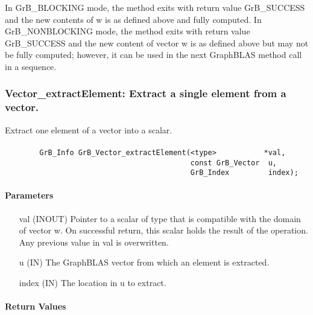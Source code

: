 In {\sf GrB\_BLOCKING} mode, the method exits with return value 
{\sf GrB\_SUCCESS} and the new contents of {\sf w} is as defined above
and fully computed.  
In {\sf GrB\_NONBLOCKING} mode, the method exits with return value 
{\sf GrB\_SUCCESS} and the new content of vector {\sf w} is as defined above 
but may not be fully computed; however, it can be used in the next GraphBLAS 
method call in a sequence.


\subsubsection{{\sf Vector\_extractElement}: Extract a single element from a vector.}
\label{Sec:Vector_extractElement}

Extract one element of a vector into a scalar. 

\paragraph{\syntax}

\begin{verbatim}
        GrB_Info GrB_Vector_extractElement(<type>           *val,
                                           const GrB_Vector  u,
                                           GrB_Index         index); 
\end{verbatim}

\paragraph{Parameters}

\begin{itemize}[leftmargin=1in]
    \item[{\sf val}]   ({\sf INOUT}) Pointer to a scalar of type that is 
    compatible with the domain of vector {\sf w}. On successful return, this scalar 
    holds the result of the operation. Any previous value in {\sf val} is 
    overwritten.

    \item[{\sf u}]     ({\sf IN}) The GraphBLAS vector from which an element
    is extracted.
    
    \item[{\sf index}] ({\sf IN}) The location in {\sf u} to extract.
\end{itemize}

\paragraph{Return Values}

